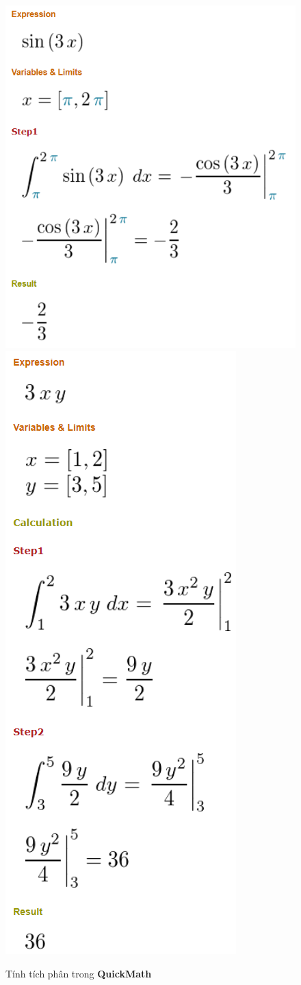 \documentclass[a4paper]{article}
\begin{document}
\begin{enumerate}
\begin{itemize}
\begin{figure}
	\centering
	\includegraphics[width=0.5\linewidth]{quickmath6}
	\includegraphics[width=0.5\linewidth]{quickmath7}
	\caption{Tính tích phân trong \textbf{QuickMath}}
	\label{fig:quickmath6}
\end{figure}
\end{itemize}

\end{enumerate}	
\end{document}

